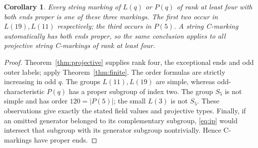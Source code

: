 \documentclass[11pt,a4paper]{article}
\newtheorem{corollary}[theorem]{Corollary}
\begin{document}
\begin{corollary}\label{cor:projective}
Every string marking of $L(q)$ or $P(q)$ of rank at least four with both
ends proper is one of these three markings. The first two occur in
$L(19),L(11)$ respectively; the third occurs in $P(5)$.
A string C-marking automatically has both ends proper, so the same
conclusion applies to all projective string C-markings of rank at least four.
\end{corollary}
\begin{proof}
Theorem~\ref{thm:projective} supplies rank four, the exceptional ends and
odd outer labels; apply Theorem~\ref{thm:finite}. The order formulas are
strictly increasing in odd $q$. The groups $L(11),L(19)$ are simple,
whereas odd-characteristic $P(q)$ has a proper subgroup of index two.
The group $S_5$ is not simple and has order $120=|P(5)|$; the small
$L(3)$ is not $S_5$. These observations give exactly the stated field
values and projective types. Finally, if an omitted generator belonged
to its complementary subgroup, \eqref{eq:ip} would intersect that subgroup
with its generator subgroup nontrivially. Hence C-markings have proper ends.
\end{proof}
\end{document}
